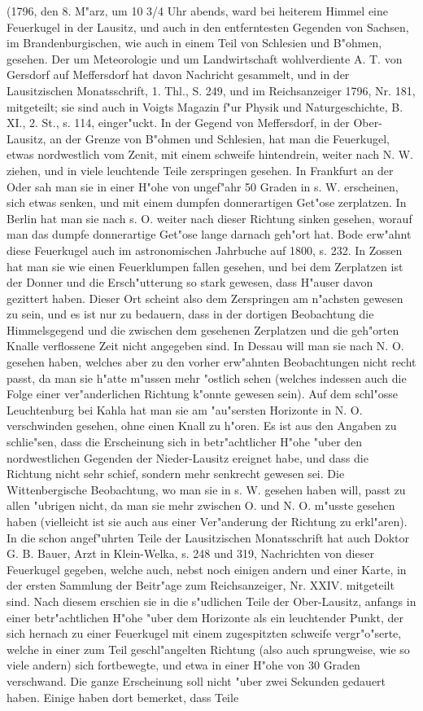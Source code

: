 \documentclass[a4paper, 11pt, oneside, polutonikogreek, german]{article}
\begin{document}
(1796, den 8. M"arz, um 10 3/4 Uhr abends, ward bei heiterem Himmel eine Feuerkugel in der Lausitz, und auch in den entferntesten Gegenden von Sachsen, im Brandenburgischen, wie auch in einem Teil von Schlesien und B"ohmen, gesehen. Der um Meteorologie und um Landwirtschaft wohlverdiente A. T. von Gersdorf auf Meffersdorf hat davon Nachricht gesammelt, und in der Lausitzischen Monatsschrift, 1. Thl., S. 249, und im Reichsanzeiger 1796, Nr. 181, mitgeteilt; sie sind auch in Voigts Magazin f"ur Physik und Naturgeschichte, B. XI., 2. St., s. 114, einger"uckt. In der Gegend von Meffersdorf, in der Ober-Lausitz, an der Grenze von B"ohmen und Schlesien, hat man die Feuerkugel, etwas nordwestlich vom Zenit, mit einem schweife hintendrein, weiter nach N. W. ziehen, und in viele leuchtende Teile zerspringen gesehen. In Frankfurt an der Oder sah man sie in einer H"ohe von ungef"ahr 50 Graden in s. W. erscheinen, sich etwas senken, und mit einem dumpfen donnerartigen Get"ose zerplatzen. In Berlin hat man sie nach s. O. weiter nach dieser Richtung sinken gesehen, worauf man das dumpfe donnerartige Get"ose lange darnach geh"ort hat. Bode erw"ahnt diese Feuerkugel auch im astronomischen Jahrbuche auf 1800, s. 232. In Zossen hat man sie wie einen Feuerklumpen fallen gesehen, und bei dem Zerplatzen ist der Donner und die Ersch"utterung so stark gewesen, dass H"auser davon gezittert haben. Dieser Ort scheint also dem Zerspringen am n"achsten gewesen zu sein, und es ist nur zu bedauern, dass in der dortigen Beobachtung die Himmelsgegend und die zwischen dem gesehenen Zerplatzen und die geh"orten Knalle verflossene Zeit nicht angegeben sind. In Dessau will man sie nach N. O. gesehen haben, welches aber zu den vorher erw"ahnten Beobachtungen nicht recht passt, da man sie h"atte m"ussen mehr "ostlich sehen (welches indessen auch die Folge einer ver"anderlichen Richtung k"onnte gewesen sein). Auf dem schl"osse Leuchtenburg bei Kahla hat man sie am "au"sersten Horizonte in N. O. verschwinden gesehen, ohne einen Knall zu h"oren. Es ist aus den Angaben zu schlie"sen, dass die Erscheinung sich in betr"achtlicher H"ohe "uber den nordwestlichen Gegenden der Nieder-Lausitz ereignet habe, und dass die Richtung nicht sehr schief, sondern mehr senkrecht gewesen sei. Die Wittenbergische Beobachtung, wo man sie in s. W. gesehen haben will, passt zu allen "ubrigen nicht, da man sie mehr zwischen O. und N. O. m"usste gesehen haben (vielleicht ist sie auch aus einer Ver"anderung der Richtung zu erkl"aren). In die schon angef"uhrten Teile der Lausitzischen Monatsschrift hat auch Doktor G. B. Bauer, Arzt in Klein-Welka, s. 248 und 319, Nachrichten von dieser Feuerkugel gegeben, welche auch, nebst noch einigen andern und einer Karte, in der ersten Sammlung der Beitr"age zum Reichsanzeiger, Nr. XXIV. mitgeteilt sind. Nach diesem erschien sie in die s"udlichen Teile der Ober-Lausitz, anfangs in einer betr"achtlichen H"ohe "uber dem Horizonte als ein leuchtender Punkt, der sich hernach zu einer Feuerkugel mit einem zugespitzten schweife vergr"o"serte, welche in einer zum Teil geschl"angelten Richtung (also auch sprungweise, wie so viele andern) sich fortbewegte, und etwa in einer H"ohe von 30 Graden verschwand. Die ganze Erscheinung soll nicht "uber zwei Sekunden gedauert haben. Einige haben dort bemerket, dass Teile 
\end{document}
